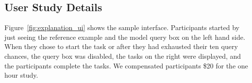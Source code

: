\subsection{User Study Details}
\label{appendix:exp_user_study}

Figure~\ref{fig:explanation_ui} shows the sample interface. 
Participants started by just seeing the reference example and the model query box on the left hand side.
When they chose to start the task or after they had exhausted their ten query chances, the query box was disabled, the tasks on the right were displayed, and the participants complete the tasks.
We compensated participants \$20 for the one hour study.
